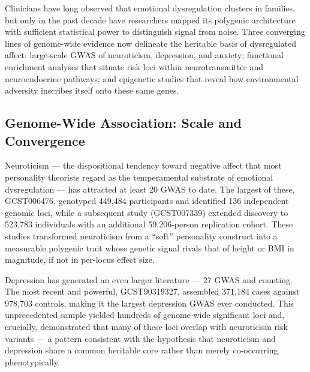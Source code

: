 



Clinicians have long observed that emotional dysregulation clusters in families,
but only in the past decade have researchers mapped its polygenic architecture
with sufficient statistical power to distinguish signal from noise.\cite{polderman2015}
Three converging lines of genome-wide evidence now delineate the heritable
basis of dysregulated affect: large-scale GWAS of neuroticism, depression, and
anxiety; functional enrichment analyses that situate risk loci within
neurotransmitter and neuroendocrine pathways; and epigenetic studies that reveal
how environmental adversity inscribes itself onto these same genes.

\subsection*{Genome-Wide Association: Scale and Convergence}

Neuroticism — the dispositional tendency toward negative affect that most
personality theorists regard as the temperamental substrate of emotional
dysregulation — has attracted at least 20 GWAS to date.\cite{sollis2023,nagel2018}
The largest of these, GCST006476, genotyped 449,484 participants and identified
136 independent genomic loci, while a subsequent study (GCST007339) extended
discovery to 523,783 individuals with an additional 59,206-person replication
cohort.\cite{nagel2018,luciano2018}
These studies transformed neuroticism from a ``soft'' personality construct into
a measurable polygenic trait whose genetic signal rivals that of height or
BMI in magnitude, if not in per-locus effect size.

Depression has generated an even larger literature — 27 GWAS and counting.
The most recent and powerful, GCST90319327, assembled 371,184 cases against
978,703 controls, making it the largest depression GWAS ever
conducted.\cite{als2023}
This unprecedented sample yielded hundreds of genome-wide significant loci and,
crucially, demonstrated that many of these loci overlap with neuroticism risk
variants — a pattern consistent with the hypothesis that neuroticism and
depression share a common heritable core rather than merely co-occurring
phenotypically.

